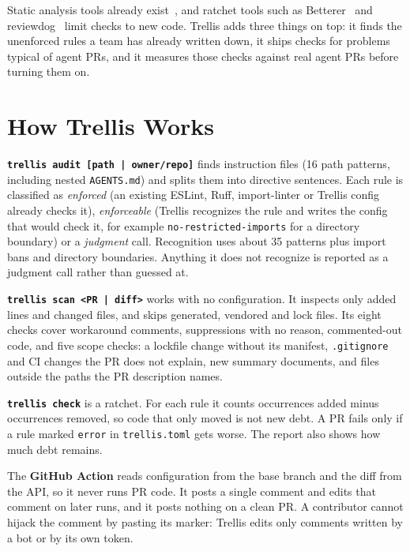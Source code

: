 \documentclass[sigconf]{acmart}
\begin{document}
Static analysis tools already exist~\cite{semgrep,johnson2013why,sadowski2018lessons}, and ratchet tools such as Betterer~\cite{betterer} and reviewdog~\cite{reviewdog} limit checks to new code. Trellis adds three things on top: it finds the unenforced rules a team has already written down, it ships checks for problems typical of agent PRs, and it measures those checks against real agent PRs before turning them on.

\section{How Trellis Works}
\textbf{\texttt{trellis audit [path | owner/repo]}} finds instruction files (16 path patterns, including nested \texttt{AGENTS.md}) and splits them into directive sentences. Each rule is classified as \emph{enforced} (an existing ESLint, Ruff, import-linter or Trellis config already checks it), \emph{enforceable} (Trellis recognizes the rule and writes the config that would check it, for example \texttt{no-restricted-imports} for a directory boundary) or a \emph{judgment} call. Recognition uses about 35 patterns plus import bans and directory boundaries. Anything it does not recognize is reported as a judgment call rather than guessed at.

\textbf{\texttt{trellis scan <PR | diff>}} works with no configuration. It inspects only added lines and changed files, and skips generated, vendored and lock files. Its eight checks cover workaround comments, suppressions with no reason, commented-out code, and five scope checks: a lockfile change without its manifest, \texttt{.gitignore} and CI changes the PR does not explain, new summary documents, and files outside the paths the PR description names.

\textbf{\texttt{trellis check}} is a ratchet. For each rule it counts occurrences added minus occurrences removed, so code that only moved is not new debt. A PR fails only if a rule marked \texttt{error} in \texttt{trellis.toml} gets worse. The report also shows how much debt remains.

The \textbf{GitHub Action} reads configuration from the base branch and the diff from the API, so it never runs PR code. It posts a single comment and edits that comment on later runs, and it posts nothing on a clean PR. A contributor cannot hijack the comment by pasting its marker: Trellis edits only comments written by a bot or by its own token.
\end{document}

